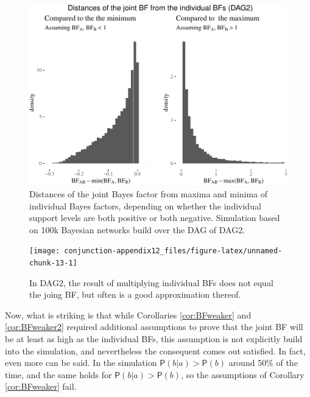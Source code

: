 \documentclass[
  10pt,
  dvipsnames,enabledeprecatedfontcommands]{scrartcl}
\newcommand{\pr}[1]{\ensuremath{\mathsf{P}(#1)}}
\begin{document}
\begin{figure}

\begin{center}\includegraphics[width=1\linewidth]{conjunction-appendix12_files/figure-latex/BFind2-1} \end{center}

\caption{Distances of the joint Bayes factor from maxima and minima of individual Bayes factors, depending on whether the individual support levels are both positive or both negative. Simulation based on 100k Bayesian networks build over the DAG of \textsf{DAG2}.}
\label{fig:BFind2}
\end{figure}

\begin{figure}

\begin{center}\texttt{[image: conjunction-appendix12\_files/figure-latex/unnamed-chunk-13-1]} \end{center}
\caption{In DAG2, the result of multiplying individual BFs does not equal the joing BF, but often is a good approximation thereof.}
\label{fig:BFmulti}
\end{figure}

Now, what is striking is that while Corollaries \ref{cor:BFweaker} and
\ref{cor:BFweaker2} required additional assumptions to prove that the
joint \textsf{BF} will be at least as high as the individual
\textsf{BFs}, this assumption is not explicitly build into the
simulation, and nevertheless the consequent comes out satisfied. In
fact, even more can be said. In the simulation
\(\pr{b \vert a}> \pr{b}\) around 50\% of the time, and the same holds
for \(\pr{b \vert a}> \pr{b}\), so the assumptions of Corollary
\ref{cor:BFweaker} fail.
\end{document}
